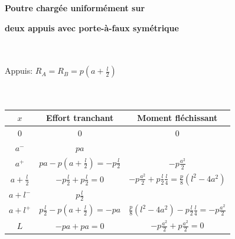 \documentclass[a4paper]{article}
\begin{document}
\begin{minipage}{9.5cm}
\centerline{\textbf{Poutre chargée uniformément sur}}
\centerline{\textbf{deux appuis avec porte-à-faux symétrique}}
~\\
~\\
Appuis: $R_A = R_B = p(a + \frac{l}{2})$\\
~\\
~\\
\small
\begin{tabular}{|c|c|c|}\hline
$x$&
Effort tranchant&
Moment fléchissant\\
\hline
$0$&
$0$&
$0$\\
\hline
$a^-$&
$pa$&
\\
\hline
$a^+$&
$pa - p(a+\frac{l}{2}) = -p\frac{l}{2}$&
$-p\frac{a^2}{2}$\\
\hline
$a+\frac{l}{2}$&
$-p\frac{l}{2} + p\frac{l}{2} = 0$&
$-p\frac{a^2}{2} + p\frac{l}{2}\frac{l}{4} = \frac{p}{8}(l^2 - 4a^2)$\\
\hline
$a+l^-$&
$p\frac{l}{2}$&
\\
\hline
$a+l^+$&
$p\frac{l}{2} - p(a+\frac{l}{2}) = -pa$&
$\frac{p}{8}(l^2 - 4a^2) - p\frac{l}{2}\frac{l}{4} = -p\frac{a^2}{2}$\\
\hline
$L$&
$-pa + pa = 0$&
$-p\frac{a^2}{2} + p\frac{a^2}{2} = 0$\\
\hline
\end{tabular}
\normalsize
\end{minipage}
\end{document}
